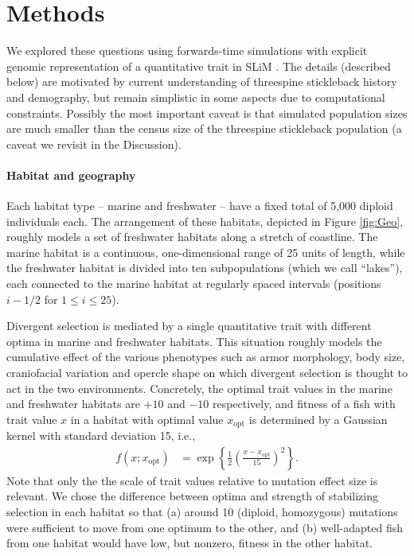 \documentclass{article}
\begin{document}
\section*{Methods}

We explored these questions using forwards-time simulations with explicit genomic representation of a quantitative trait in SLiM \citep{haller2017slim,haller2018slim3}.
The details (described below) are motivated by current understanding of threespine stickleback history and demography, but remain simplistic in some aspects due to computational constraints.
Possibly the most important caveat is that simulated population sizes are much smaller than the census size of the threespine stickleback population
(a caveat we revisit in the Discussion).

\paragraph{Habitat and geography}
Each habitat type -- marine and freshwater -- have a fixed total of 5,000 diploid individuals each. 
The arrangement of these habitats, depicted in Figure \ref{fig:Geo},
roughly models a set of freshwater habitats along a stretch of coastline. 
The marine habitat  is a continuous, one-dimensional range of 25 units of length,
while the freshwater habitat is divided into ten subpopulations (which we call ``lakes''),
each connected to the marine habitat at regularly spaced intervals
(positions $i - 1/2$ for $1 \le i \le 25$).

Divergent selection is mediated by a single quantitative trait
with different optima in marine and freshwater habitats.
This situation roughly models the cumulative effect of the various phenotypes such as armor morphology, 
body size, craniofacial variation and opercle shape on which divergent selection is thought to act
in the two environments. 
Concretely, the optimal trait values in the marine and freshwater habitats are $+10$ and $-10$ respectively,
and fitness of a fish with trait value $x$ in a habitat with optimal value $x_\text{opt}$
is determined by a Gaussian kernel with standard deviation 15, i.e.,
\begin{align*}
    f(x; x_\text{opt})
    &=
    \exp\left\{
        \frac{1}{2}
            \left(
            \frac{x-x_\text{opt}}{15}
            \right)^2
        \right\} .
\end{align*}
Note that only the the scale of trait values relative to mutation effect size is relevant.
We chose the difference between optima and strength of stabilizing selection in each habitat
so that 
(a) around 10 (diploid, homozygous) mutations were sufficient to move from one optimum to the other,
and (b) well-adapted fish from one habitat would have low, but nonzero, fitness in the other habitat.
\end{document}

